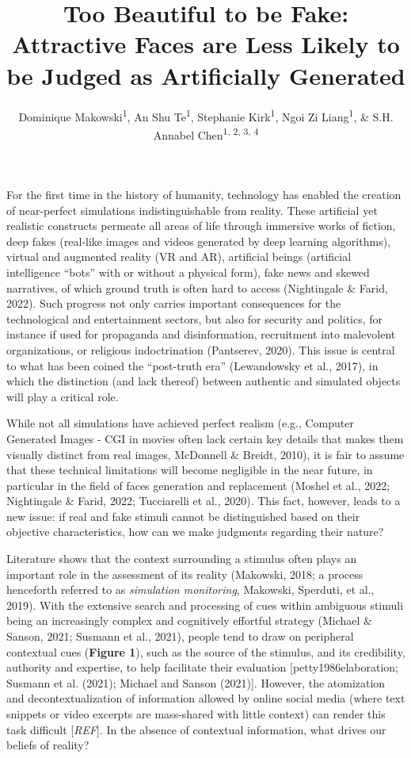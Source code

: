\documentclass[
  man,floatsintext]{apa6}
\title{\textbf{Too Beautiful to be Fake: Attractive Faces are Less Likely to be Judged as Artificially Generated}}
\author{Dominique Makowski\textsuperscript{1}, An Shu Te\textsuperscript{1}, Stephanie Kirk\textsuperscript{1}, Ngoi Zi Liang\textsuperscript{1}, \& S.H. Annabel Chen\textsuperscript{1, 2, 3, 4}}
\date{}
\affiliation{\vspace{0.5cm}\textsuperscript{1} School of Social Sciences, Nanyang Technological University, Singapore\\\textsuperscript{2} LKC Medicine, Nanyang Technological University, Singapore\\\textsuperscript{3} National Institute of Education, Singapore\\\textsuperscript{4} Centre for Research and Development in Learning, Nanyang Technological University, Singapore}
\begin{document}
\maketitle

For the first time in the history of humanity, technology has enabled the creation of near-perfect simulations indistinguishable from reality. These artificial yet realistic constructs permeate all areas of life through immersive works of fiction, deep fakes (real-like images and videos generated by deep learning algorithms), virtual and augmented reality (VR and AR), artificial beings (artificial intelligence ``bots'' with or without a physical form), fake news and skewed narratives, of which ground truth is often hard to access (Nightingale \& Farid, 2022). Such progress not only carries important consequences for the technological and entertainment sectors, but also for security and politics, for instance if used for propaganda and disinformation, recruitment into malevolent organizations, or religious indoctrination (Pantserev, 2020). This issue is central to what has been coined the ``post-truth era'' (Lewandowsky et al., 2017), in which the distinction (and lack thereof) between authentic and simulated objects will play a critical role.

While not all simulations have achieved perfect realism (e.g., Computer Generated Images - CGI in movies often lack certain key details that makes them visually distinct from real images, McDonnell \& Breidt, 2010), it is fair to assume that these technical limitations will become negligible in the near future, in particular in the field of faces generation and replacement (Moshel et al., 2022; Nightingale \& Farid, 2022; Tucciarelli et al., 2020). This fact, however, leads to a new issue: if real and fake stimuli cannot be distinguished based on their objective characteristics, how can we make judgments regarding their nature?

Literature shows that the context surrounding a stimulus often plays an important role in the assessment of its reality (Makowski, 2018; a process henceforth referred to as \emph{simulation monitoring}, Makowski, Sperduti, et al., 2019). With the extensive search and processing of cues within ambiguous stimuli being an increasingly complex and cognitively effortful strategy (Michael \& Sanson, 2021; Susmann et al., 2021), people tend to draw on peripheral contextual cues (\textbf{Figure 1}), such as the source of the stimulus, and its credibility, authority and expertise, to help facilitate their evaluation {[}petty1986elaboration; Susmann et al. (2021); Michael and Sanson (2021){]}. However, the atomization and decontextualization of information allowed by online social media (where text snippets or video excerpts are mass-shared with little context) can render this task difficult {[}\emph{REF}{]}. In the absence of contextual information, what drives our beliefs of reality?
\end{document}
